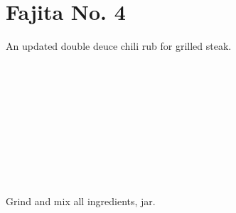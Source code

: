 \section[Fajita No. 4]{Fajita No. 4~}\label{fajita_no_4}

\begin{recipestats}[
        servings=8~\fluidounce,
        preptime=5~\minute,
        source=Mike \& Jane,
    ]
\end{recipestats}

\begin{recipeabstract}
    An updated double deuce chili rub for grilled steak.
\end{recipeabstract}

\begin{ingredientcolumns}
    \begin{ingredientblock}
        \\
        \\
        \\
        \\
    \end{ingredientblock}
    \begin{ingredientblock}
        \\
        \\
        \\
        \\
    \end{ingredientblock}
\end{ingredientcolumns}

\begin{preparation}
\item Grind and mix all ingredients, jar.
\end{preparation}

\recipeend%

